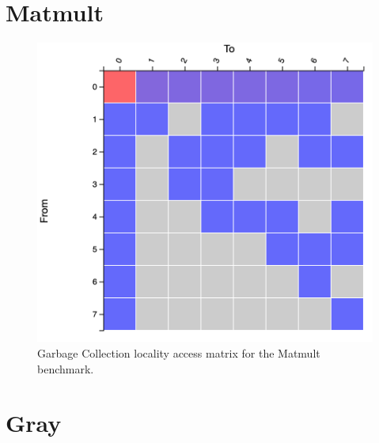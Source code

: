 \documentclass[a4paper,11pt]{article}
\begin{document}
\section{Matmult}

\begin{table}[!htb]
  \centering
  \caption{Garbage Collection frequencies per region and per generation.}
  \label{table:baseline}
\end{table}

\begin{figure}[!htb]
    \centering
    \includegraphics[width=0.6\linewidth]{TechMemo/gc/images/matmult_gc.png}
    \caption{Garbage Collection locality access matrix for the Matmult benchmark.}
    \label{fig:my_label}
\end{figure}

\section{Gray}

\begin{table}[!htb]
  \centering
  \caption{Garbage Collection frequencies per region and per generation.}
  \label{table:baseline}
\end{table}
\end{document}
